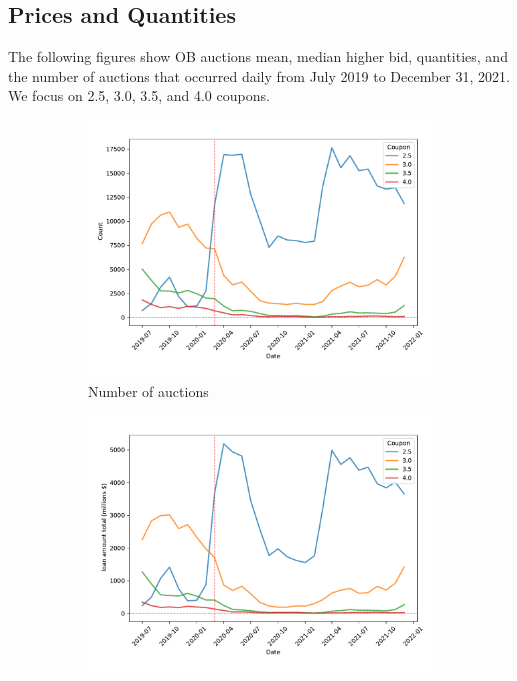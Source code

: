 \documentclass[11pt,a4paper]{article}
\begin{document}
\pagebreak
\subsection{Prices and Quantities}

The following figures show OB auctions mean, median higher bid, quantities, and the number of auctions that occurred daily from July 2019 to December 31,  2021. We focus on 2.5, 3.0, 3.5, and 4.0 coupons. 


\begin{figure}[h]
  \centering
  \begin{subfigure}[b]{0.49\textwidth}
      \includegraphics[width=0.998\textwidth]{../results/figures/winner_bid_count_mat30_loan1_timeseries_cpmonthly_2.5_4_.pdf}
      \caption{ Number of auctions}
     \end{subfigure}
     \begin{subfigure}[b]{0.49\textwidth}
      \includegraphics[width=0.998\textwidth]{../results/figures/LoanAmount_sum_mat30_loan1_timeseries_cpmonthly_2.5_4_.pdf}

\end{subfigure}
\end{figure}
\end{document}
